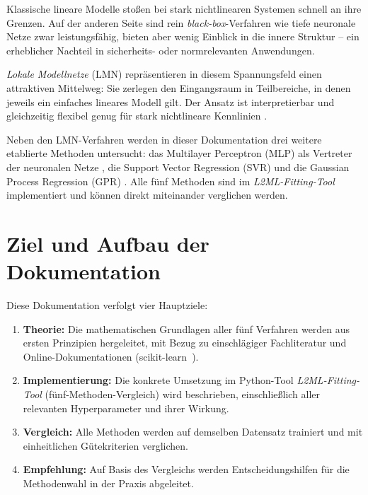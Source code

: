 \documentclass[11pt,a4paper]{report}
\begin{document}
Klassische lineare Modelle sto\ss{}en bei stark nichtlinearen Systemen schnell an ihre Grenzen.
Auf der anderen Seite sind rein \emph{black-box}-Verfahren wie tiefe neuronale Netze zwar
leistungsf\"{a}hig, bieten aber wenig Einblick in die innere Struktur -- ein erheblicher Nachteil
in sicherheits- oder normrelevanten Anwendungen.

\emph{Lokale Modellnetze} (LMN) repr\"{a}sentieren in diesem Spannungsfeld einen attraktiven
Mittelweg: Sie zerlegen den Eingangsraum in Teilbereiche, in denen jeweils ein einfaches
lineares Modell gilt. Der Ansatz ist interpretierbar und gleichzeitig flexibel genug f\"{u}r
stark nichtlineare Kennlinien \cite{nelles2001, murray1998}.

Neben den LMN-Verfahren werden in dieser Dokumentation drei weitere etablierte Methoden
untersucht: das Multilayer Perceptron (MLP) als Vertreter der neuronalen Netze \cite{goodfellow2016},
die Support Vector Regression (SVR) \cite{vapnik1998} und die Gaussian Process Regression (GPR)
\cite{rasmussen2006}. Alle f\"{u}nf Methoden sind im \emph{L2ML-Fitting-Tool} implementiert
und k\"{o}nnen direkt miteinander verglichen werden.

\section{Ziel und Aufbau der Dokumentation}

Diese Dokumentation verfolgt vier Hauptziele:

\begin{enumerate}
\item \textbf{Theorie:} Die mathematischen Grundlagen aller f\"{u}nf Verfahren werden
      aus ersten Prinzipien hergeleitet, mit Bezug zu einschl\"{a}giger Fachliteratur
      und Online-Dokumentationen (scikit-learn~\cite{sklearn_mlp,sklearn_svr,sklearn_gpr}).

\item \textbf{Implementierung:} Die konkrete Umsetzung im Python-Tool \emph{L2ML-Fitting-Tool}
      (f\"{u}nf-Methoden-Vergleich) wird beschrieben, einschlie\ss{}lich aller relevanten
      Hyperparameter und ihrer Wirkung.

\item \textbf{Vergleich:} Alle Methoden werden auf demselben Datensatz trainiert und mit
      einheitlichen G\"{u}tekriterien verglichen.

\item \textbf{Empfehlung:} Auf Basis des Vergleichs werden Entscheidungshilfen f\"{u}r die
      Methodenwahl in der Praxis abgeleitet.
\end{enumerate}
\end{document}
